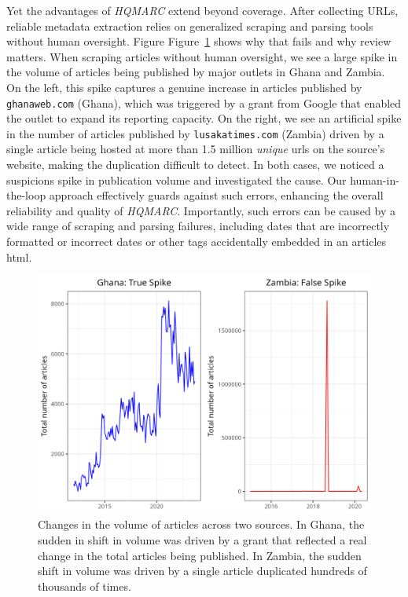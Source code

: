 \documentclass[
  letterpaper,
  DIV=11,
  numbers=noendperiod]{scrartcl}
\begin{document}
Yet the advantages of \emph{HQMARC} extend beyond coverage. After
collecting URLs, reliable metadata extraction relies on generalized
scraping and parsing tools without human oversight. Figure
Figure~\ref{fig-true_false_spike} shows why that fails and why review
matters. When scraping articles without human oversight, we see a large
spike in the volume of articles being published by major outlets in
Ghana and Zambia. On the left, this spike captures a genuine increase in
articles published by \texttt{ghanaweb.com} (Ghana), which was triggered
by a grant from Google that enabled the outlet to expand its reporting
capacity. On the right, we see an artificial spike in the number of
articles published by \texttt{lusakatimes.com} (Zambia) driven by a
single article being hosted at more than 1.5 million \emph{unique} urls
on the source's website, making the duplication difficult to detect. In
both cases, we noticed a suspicions spike in publication volume and
investigated the cause. Our human-in-the-loop approach effectively
guards against such errors, enhancing the overall reliability and
quality of \emph{HQMARC}. Importantly, such errors can be caused by a
wide range of scraping and parsing failures, including dates that are
incorrectly formatted or incorrect dates or other tags accidentally
embedded in an articles html.

\begin{figure}

{\centering \includegraphics{source_comparison/figures/true_false_spike.png}

}

\caption{\label{fig-true_false_spike}Changes in the volume of articles
across two sources. In Ghana, the sudden in shift in volume was driven
by a grant that reflected a real change in the total articles being
published. In Zambia, the sudden shift in volume was driven by a single
article duplicated hundreds of thousands of times.}

\end{figure}
\end{document}

